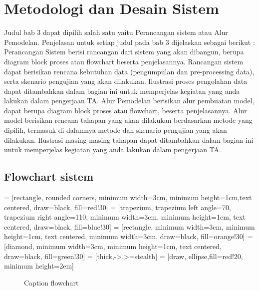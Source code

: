 \chapter{Metodologi dan Desain Sistem}

Judul bab 3 dapat dipilih salah satu yaitu Perancangan sistem atau Alur Pemodelan. Penjelasan untuk setiap judul pada bab 3 dijelaskan sebagai berikut :
Perancangan Sistem berisi rancangan dari sistem yang akan dibangun, berupa diagram block proses atau flowchart beserta penjelasannya. Rancangan sistem dapat berisikan rencana kebutuhan data (pengumpulan dan pre-processing data), serta skenario pengujian yang akan dilakukan. Ilustrasi proses pengolahan data dapat ditambahkan dalam bagian ini untuk memperjelas kegiatan yang anda lakukan dalam pengerjaan TA.
Alur Pemodelan berisikan alur pembuatan model, dapat berupa diagram block proses atau flowchart, beserta penjelasannya. Alur model berisikan rencana tahapan yang akan dilakukan berdasarkan metode yang dipilih, termasuk di dalamnya metode dan skenario pengujian yang akan dilakukan. Ilustrasi masing-masing tahapan dapat ditambahkan dalam bagian ini untuk memperjelas kegiatan yang anda lakukan dalam pengerjaan TA.

\section{Flowchart sistem}

 = [rectangle, rounded corners, minimum width=3cm, minimum height=1cm,text centered, draw=black, fill=red!30]
 = [trapezium, trapezium left angle=70, trapezium right angle=110, minimum width=3cm, minimum height=1cm, text centered, draw=black, fill=blue!30]
 = [rectangle, minimum width=3cm, minimum height=1cm, text centered, minimum width=3cm, draw=black, fill=orange!30]
 = [diamond, minimum width=3cm, minimum height=1cm, text centered, draw=black, fill=green!30]
 = [thick,->,>=stealth]
 = [draw, ellipse,fill=red!20,
    minimum height=2em]

\begin{figure}[h!]
    \centering
    \caption{Caption flowchart}
    \label{figflow}
\end{figure}

